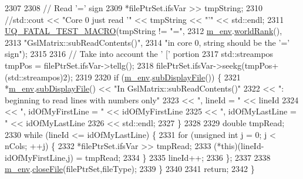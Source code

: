 \begin{DoxyCode}
2307 
2308     \textcolor{comment}{// Read '=' sign}
2309     *filePtrSet.ifsVar >> tmpString;
2310     \textcolor{comment}{//std::cout << "Core 0 just read '" << tmpString << "'" << std::endl;}
2311     \hyperlink{_defines_8h_a56d63d18d0a6d45757de47fcc06f574d}{UQ\_FATAL\_TEST\_MACRO}(tmpString != \textcolor{stringliteral}{"="},
2312                         \hyperlink{class_q_u_e_s_o_1_1_matrix_a247fb0fc0b87fecdee054bb4660b68e8}{m\_env}.\hyperlink{class_q_u_e_s_o_1_1_base_environment_a78b57112bbd0e6dd0e8afec00b40ffa7}{worldRank}(),
2313                         \textcolor{stringliteral}{"GslMatrix::subReadContents()"},
2314                         \textcolor{stringliteral}{"in core 0, string should be the '=' sign"});
2315 
2316     \textcolor{comment}{// Take into account the ' [' portion}
2317     std::streampos tmpPos = filePtrSet.ifsVar->tellg();
2318     filePtrSet.ifsVar->seekg(tmpPos+(std::streampos)2);
2319 
2320     \textcolor{keywordflow}{if} (\hyperlink{class_q_u_e_s_o_1_1_matrix_a247fb0fc0b87fecdee054bb4660b68e8}{m\_env}.\hyperlink{class_q_u_e_s_o_1_1_base_environment_a8a0064746ae8dddfece4229b9ad374d6}{subDisplayFile}()) \{
2321       *\hyperlink{class_q_u_e_s_o_1_1_matrix_a247fb0fc0b87fecdee054bb4660b68e8}{m\_env}.\hyperlink{class_q_u_e_s_o_1_1_base_environment_a8a0064746ae8dddfece4229b9ad374d6}{subDisplayFile}() << \textcolor{stringliteral}{"In GslMatrix::subReadContents()"}
2322                               << \textcolor{stringliteral}{": beginning to read lines with numbers only"}
2323                               << \textcolor{stringliteral}{", lineId = "}          << lineId
2324                               << \textcolor{stringliteral}{", idOfMyFirstLine = "} << idOfMyFirstLine
2325                               << \textcolor{stringliteral}{", idOfMyLastLine = "}  << idOfMyLastLine
2326                               << std::endl;
2327     \}
2328 
2329     \textcolor{keywordtype}{double} tmpRead;
2330     \textcolor{keywordflow}{while} (lineId <= idOfMyLastLine) \{
2331       \textcolor{keywordflow}{for} (\textcolor{keywordtype}{unsigned} \textcolor{keywordtype}{int} j = 0; j < nCols; ++j) \{
2332         *filePtrSet.ifsVar >> tmpRead;
2333         (*this)(lineId-idOfMyFirstLine,j) = tmpRead;
2334       \}
2335       lineId++;
2336     \};
2337 
2338     \hyperlink{class_q_u_e_s_o_1_1_matrix_a247fb0fc0b87fecdee054bb4660b68e8}{m\_env}.\hyperlink{class_q_u_e_s_o_1_1_base_environment_ab712bff194ddd91459d4ea8715c77e8b}{closeFile}(filePtrSet,fileType);
2339   \}
2340 
2341   \textcolor{keywordflow}{return};
2342 \}
\end{DoxyCode}
